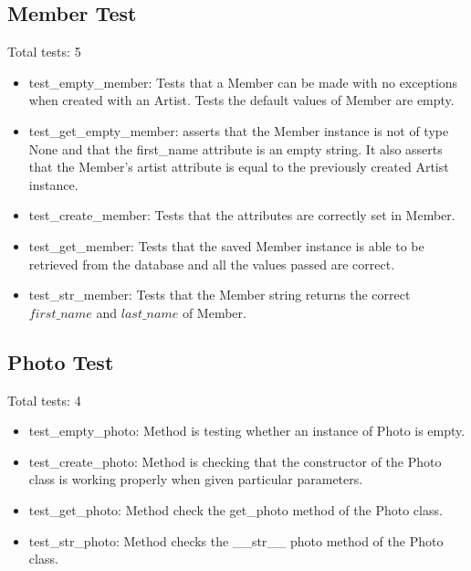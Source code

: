 \documentclass[12pt,english]{scrartcl}
\begin{document}
\subsection{Member Test} 
Total tests: 5

\begin{itemize} 
\item test\_empty\_member:  Tests that a Member can be made with no exceptions when created with an Artist. Tests the default values of Member are empty.
 
\item  test\_get\_empty\_member: asserts that the Member instance is not of type None and that the first\_name attribute is an empty string. 
It also asserts that the Member’s artist attribute is equal to the previously created Artist instance.
 
\item  test\_create\_member: Tests that the attributes are correctly set in Member.
 
\item  test\_get\_member: Tests that the saved Member instance is able to be retrieved from the database and all the values passed 
are correct.
 
\item  test\_str\_member: Tests that the Member string returns the correct $first\_name$ and $last\_name$ of Member.
\end{itemize}

\subsection{Photo Test} 
Total tests: 4
\begin{itemize}
\item test\_empty\_photo: Method is testing whether an instance of Photo is empty.

\item test\_create\_photo: Method is checking that the constructor of the Photo class is working properly when given particular parameters. 

\item test\_get\_photo: Method check the get\_photo method of the Photo class.

\item test\_str\_photo: Method checks the \_\_str\_\_ photo method of the Photo class.
\end{itemize}
\end{document}
